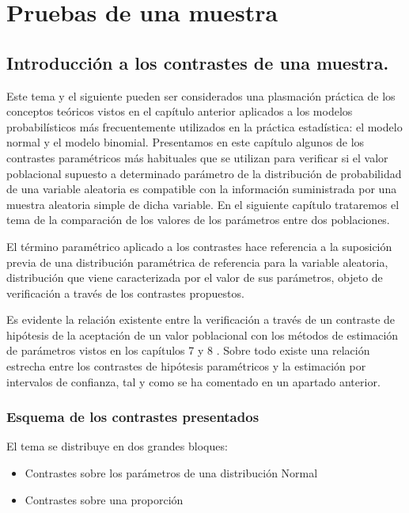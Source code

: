 \documentclass[
]{article}
\providecommand{\tightlist}{%
  \setlength{\itemsep}{0pt}\setlength{\parskip}{0pt}}
\begin{document}
\newpage

\section{Pruebas de una muestra}\label{pruebas-de-una-muestra}

\subsection{Introducción a los contrastes de una muestra.}\label{introducciuxf3n-a-los-contrastes-de-una-muestra.}

Este tema y el siguiente pueden ser considerados una plasmación práctica de los conceptos teóricos vistos en el capítulo anterior aplicados a los modelos probabilísticos más frecuentemente utilizados en la práctica estadística: el modelo normal y el modelo binomial. Presentamos en este capítulo algunos de los contrastes paramétricos más habituales que se utilizan para verificar si el valor poblacional supuesto a determinado parámetro de la distribución de probabilidad de una variable aleatoria es compatible con la información suministrada por una muestra aleatoria simple de dicha variable. En el siguiente capítulo trataremos el tema de la comparación de los valores de los parámetros entre dos poblaciones.

El término paramétrico aplicado a los contrastes hace referencia a la suposición previa de una distribución paramétrica de referencia para la variable aleatoria, distribución que viene caracterizada por el valor de sus parámetros, objeto de verificación a través de los contrastes propuestos.

Es evidente la relación existente entre la verificación a través de un contraste de hipótesis de la aceptación de un valor poblacional con los métodos de estimación de parámetros vistos en los capítulos 7 y 8 . Sobre todo existe una relación estrecha entre los contrastes de hipótesis paramétricos y la estimación por intervalos de confianza, tal y como se ha comentado en un apartado anterior.

\subsubsection{Esquema de los contrastes presentados}\label{esquema-de-los-contrastes-presentados}

El tema se distribuye en dos grandes bloques:

\begin{itemize}
\tightlist
\item
  Contrastes sobre los parámetros de una distribución Normal
\item
  Contrastes sobre una proporción
\end{itemize}
\end{document}
